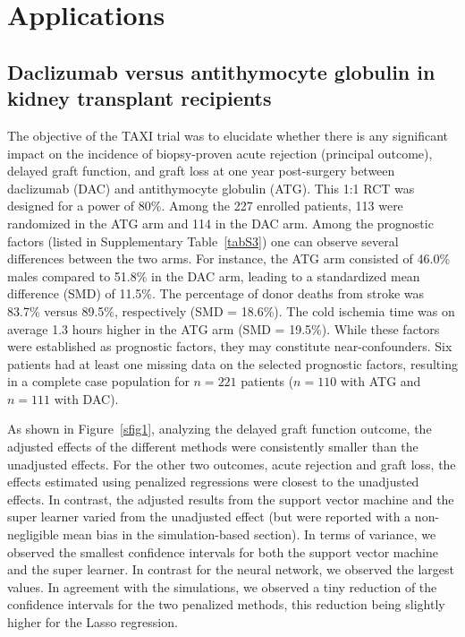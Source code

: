 \documentclass{article}
\begin{document}
\section{Applications}


\subsection{Daclizumab versus antithymocyte globulin in kidney transplant recipients}

The objective of the TAXI trial was to elucidate whether there is any significant impact on the incidence of biopsy-proven acute rejection (principal outcome), delayed graft function, and graft loss at one year post-surgery between daclizumab (DAC) and antithymocyte globulin (ATG).  \cite{noel_daclizumab_2009}  This  1:1 RCT was  designed for a power of 80\%. Among the 227 enrolled patients, 113 were randomized in the ATG arm and 114 in the DAC arm.
Among the  prognostic factors (listed in Supplementary Table~\ref{tabS3}) one can observe several  differences between the two arms. For instance, the ATG arm consisted of 46.0\% males compared to 51.8\% in the DAC arm, leading to a standardized mean difference (SMD) of 11.5\%. The percentage of donor deaths from stroke was 83.7\% versus 89.5\%, respectively (SMD = 18.6\%). The cold ischemia time was on average 1.3 hours higher in the ATG arm (SMD = 19.5\%). While these factors were established as prognostic factors, they may constitute near-confounders. Six patients had at least one missing data on the selected prognostic factors, resulting in a complete case population for $n=221$ patients ($n=110$ with ATG and $n=111$ with DAC).

As shown in Figure~\ref{sfig1}, analyzing the delayed graft function outcome, the adjusted effects of the different methods were consistently smaller than the unadjusted effects. For the other two outcomes, acute rejection and graft loss, the effects estimated using penalized regressions were closest to the unadjusted effects. In contrast, the adjusted results from the support vector machine and the super learner varied from the unadjusted effect (but were reported with a non-negligible mean bias in the simulation-based section). In terms of variance, we observed the smallest confidence intervals for both the support vector machine and the super learner. In contrast for the neural network, we observed the largest values. In agreement with the simulations, we observed a tiny reduction of the confidence intervals for the two penalized methods, this reduction being slightly higher for the Lasso regression.
\end{document}

